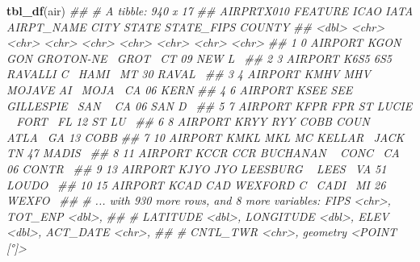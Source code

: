 \documentclass[11pt,ignorenonframetext,]{beamer}
\newenvironment{Shaded}{}{}
\newcommand{\CommentTok}[1]{\textcolor[rgb]{0.38,0.63,0.69}{\textit{#1}}}
\newcommand{\KeywordTok}[1]{\textcolor[rgb]{0.00,0.44,0.13}{\textbf{#1}}}
\newcommand{\NormalTok}[1]{#1}
\let\oldShaded\Shaded
\let\endoldShaded\endShaded
\renewenvironment{Shaded}{\footnotesize\begin{spacing}{0.9}\oldShaded}{\endoldShaded\end{spacing}}
\let\oldverbatim\verbatim
\let\endoldverbatim\endverbatim
\newcommand{\scriptoutput}{
  \renewenvironment{Shaded}{\scriptsize\begin{spacing}{0.9}\oldShaded}{\endoldShaded\end{spacing}}
  \renewenvironment{verbatim}{\scriptsize\begin{spacing}{0.9}\oldverbatim}{\endoldverbatim\end{spacing}}
}
\begin{document}
\begin{frame}[fragile,t]{}
\protect\hypertarget{section-2}{}

\scriptoutput

\begin{Shaded}
\begin{Highlighting}[]
\KeywordTok{tbl_df}\NormalTok{(air)}
\CommentTok{## # A tibble: 940 x 17}
\CommentTok{##    AIRPRTX010 FEATURE ICAO  IATA  AIRPT_NAME CITY  STATE STATE_FIPS COUNTY}
\CommentTok{##         <dbl> <chr>   <chr> <chr> <chr>      <chr> <chr> <chr>      <chr> }
\CommentTok{##  1          0 AIRPORT KGON  GON   GROTON-NE~ GROT~ CT    09         NEW L~}
\CommentTok{##  2          3 AIRPORT K6S5  6S5   RAVALLI C~ HAMI~ MT    30         RAVAL~}
\CommentTok{##  3          4 AIRPORT KMHV  MHV   MOJAVE AI~ MOJA~ CA    06         KERN  }
\CommentTok{##  4          6 AIRPORT KSEE  SEE   GILLESPIE~ SAN ~ CA    06         SAN D~}
\CommentTok{##  5          7 AIRPORT KFPR  FPR   ST LUCIE ~ FORT~ FL    12         ST LU~}
\CommentTok{##  6          8 AIRPORT KRYY  RYY   COBB COUN~ ATLA~ GA    13         COBB  }
\CommentTok{##  7         10 AIRPORT KMKL  MKL   MC KELLAR~ JACK~ TN    47         MADIS~}
\CommentTok{##  8         11 AIRPORT KCCR  CCR   BUCHANAN ~ CONC~ CA    06         CONTR~}
\CommentTok{##  9         13 AIRPORT KJYO  JYO   LEESBURG ~ LEES~ VA    51         LOUDO~}
\CommentTok{## 10         15 AIRPORT KCAD  CAD   WEXFORD C~ CADI~ MI    26         WEXFO~}
\CommentTok{## # ... with 930 more rows, and 8 more variables: FIPS <chr>, TOT_ENP <dbl>,}
\CommentTok{## #   LATITUDE <dbl>, LONGITUDE <dbl>, ELEV <dbl>, ACT_DATE <chr>,}
\CommentTok{## #   CNTL_TWR <chr>, geometry <POINT [°]>}
\end{Highlighting}
\end{Shaded}

\end{frame}
\end{document}
